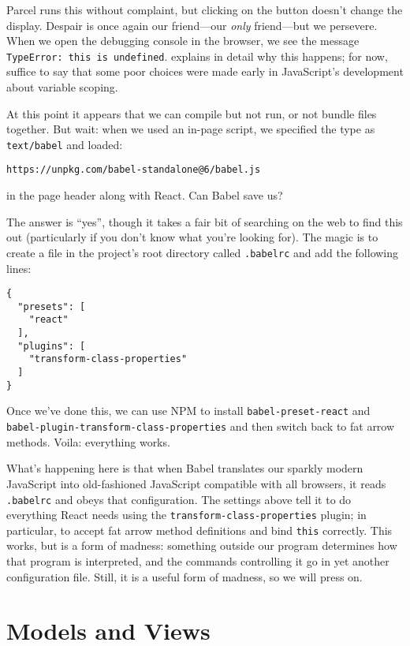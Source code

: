 Parcel runs this without complaint,
but clicking on the button doesn't change the display.
Despair is once again our friend---our \emph{only} friend---but we persevere.
When we open the debugging console in the browser,
we see the message \texttt{TypeError:\ this\ is\ undefined}.
 explains in detail why this happens;
for now, suffice to say that some poor choices were made early in JavaScript's development about variable scoping.

At this point it appears that we can compile but not run, or not bundle files together.
But wait:
when we used an in-page script, we specified the type as \texttt{text/babel}
and loaded:

\begin{verbatim}
https://unpkg.com/babel-standalone@6/babel.js
\end{verbatim}

\noindent
in the page header along with React.
Can Babel save us?

The answer is ``yes'',
though it takes a fair bit of searching on the web to find this out
(particularly if you don't know what you're looking for).
The magic is to create a file in the project's root directory called \texttt{.babelrc}
and add the following lines:

\begin{verbatim}
{
  "presets": [
    "react"
  ],
  "plugins": [
    "transform-class-properties"
  ]
}
\end{verbatim}

Once we've done this,
we can use NPM to install \texttt{babel-preset-react} and \texttt{babel-plugin-transform-class-properties}
and then switch back to fat arrow methods.
Voila: everything works.

What's happening here is that
when Babel translates our sparkly modern JavaScript into old-fashioned JavaScript compatible with all browsers,
it reads \texttt{.babelrc} and obeys that configuration.
The settings above tell it to do everything React needs using the \texttt{transform-class-properties} plugin;
in particular,
to accept fat arrow method definitions and bind \texttt{this} correctly.
This works,
but is a form of madness:
something outside our program determines how that program is interpreted,
and the commands controlling it go in yet another configuration file.
Still,
it is a useful form of madness,
so we will press on.

\section{Models and Views}\label{s:interactive-models-views}

